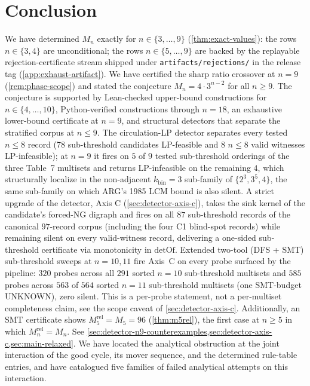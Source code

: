 \documentclass[11pt,a4paper]{article}
\theoremstyle{plain}
\theoremstyle{definition}
\newcommand{\Mn}{M_n}
\newcommand{\detOf}{\mathrm{detOf}}
\begin{document}
\section{Conclusion}\label{sec:conclusion}

We have determined $\Mn$ exactly for $n \in \{3, \ldots, 9\}$
(\cref{thm:exact-values}): the rows $n \in \{3, 4\}$ are
unconditional; the rows $n \in \{5, \ldots, 9\}$ are backed by the
replayable rejection-certificate stream shipped under
\texttt{artifacts/rejections/} in the release tag
(\cref{app:exhaust-artifact}).  We have certified the sharp ratio
crossover at $n = 9$ (\cref{rem:phase-scope}) and stated the
conjecture $\Mn = 4 \cdot 3^{n-2}$ for all $n \ge 9$.  The conjecture
is supported by Lean-checked upper-bound constructions for
$n \in \{4, \ldots, 10\}$, Python-verified constructions through
$n = 18$, an exhaustive lower-bound certificate at $n = 9$, and
structural detectors that separate the stratified corpus at
$n \le 9$. The circulation-LP detector separates every tested
$n \le 8$ record (78 sub-threshold candidates LP-feasible and 8
$n \le 8$ valid witnesses LP-infeasible); at $n = 9$ it fires on $5$
of $9$ tested sub-threshold orderings of the three Table~7 multisets
and returns LP-infeasible on the remaining $4$, which structurally
localize in the non-adjacent $k_{\mathrm{bin}} = 3$ sub-family of
$\{2^3, 3^5, 4\}$, the same sub-family on which ARG's 1985 LCM
bound is also silent.  A strict upgrade of the detector,
Axis C (\cref{sec:detector-axis-c}), takes the sink kernel of the
candidate's forced-NG digraph and fires on all $87$ sub-threshold
records of the canonical $97$-record corpus (including the four
C1 blind-spot records) while remaining silent on every valid-witness
record, delivering a one-sided sub-threshold certificate via
monotonicity in $\detOf$.  Extended two-tool (DFS + SMT)
sub-threshold sweeps at $n = 10, 11$ fire Axis~C on every probe
surfaced by the pipeline: $320$ probes across all $291$ sorted
$n = 10$ sub-threshold multisets and $585$ probes across $563$
of $564$ sorted $n = 11$ sub-threshold multisets (one SMT-budget
UNKNOWN), zero silent.  This is a per-probe statement, not a
per-multiset completeness claim, see the scope caveat of
\cref{sec:detector-axis-c}.  Additionally, an SMT certificate
shows $M_5^{\mathrm{rel}} = M_5 = 96$ (\cref{thm:m5rel}), the first
case at $n \ge 5$ in which $M_n^{\mathrm{rel}} = M_n$.  See
\cref{sec:detector-n9-counterexamples,sec:detector-axis-c,sec:main-relaxed}.
We have located the analytical obstruction at the joint interaction
of the good cycle, its mover sequence, and the determined rule-table
entries, and have catalogued five families of failed analytical
attempts on this interaction.
\end{document}
